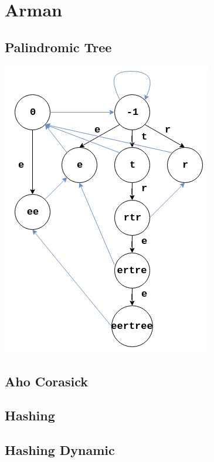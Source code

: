 \chapter{Arman}



\section{Palindromic Tree}

    \includegraphics[scale=0.3]{content/arman/EERTREE.png}


\section{Aho Corasick}
\section{Hashing}
\section{Hashing Dynamic}
